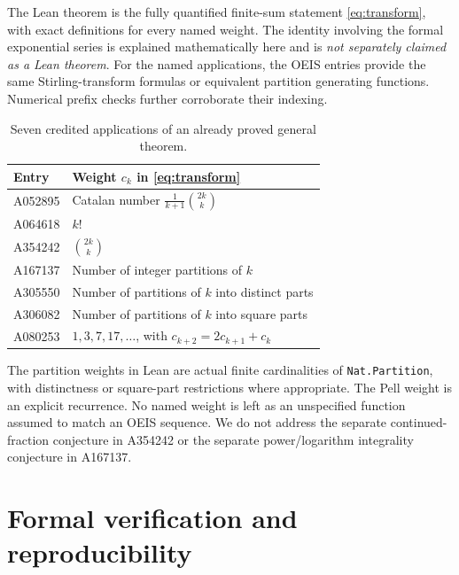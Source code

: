 \documentclass[11pt,a4paper]{article}
\theoremstyle{remark}
\begin{document}
The Lean theorem is the fully quantified finite-sum statement
\eqref{eq:transform}, with exact definitions for every named weight.
The identity involving the formal exponential series is explained
mathematically here and is \emph{not separately claimed as a Lean
theorem}. For the named applications, the OEIS entries provide the
same Stirling-transform formulas or equivalent partition generating
functions. Numerical prefix checks further corroborate their indexing.

\begin{table}[ht]
\centering\small
\begin{tabular}{@{}ll@{}}
\toprule
Entry & Weight $c_k$ in \eqref{eq:transform}\\
\midrule
A052895 & Catalan number $\frac1{k+1}\binom{2k}{k}$\\
A064618 & $k!$\\
A354242 & $\binom{2k}{k}$\\
A167137 & Number of integer partitions of $k$\\
A305550 & Number of partitions of $k$ into distinct parts\\
A306082 & Number of partitions of $k$ into square parts\\
A080253 & $1,3,7,17,\ldots$, with $c_{k+2}=2c_{k+1}+c_k$\\
\bottomrule
\end{tabular}
\caption{Seven credited applications of an already proved general theorem.}
\end{table}

The partition weights in Lean are actual finite cardinalities of
\texttt{Nat.Partition}, with distinctness or square-part restrictions
where appropriate. The Pell weight is an explicit recurrence. No named
weight is left as an unspecified function assumed to match an OEIS
sequence. We do not address the separate continued-fraction conjecture
in A354242 or the separate power/logarithm integrality conjecture in
A167137.

\section{Formal verification and reproducibility}
\end{document}
